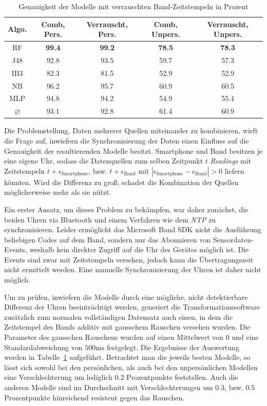 \begin{table}[h]
	\centering
	\begin{tabular}{|c|c|c||c|c|}
		\hline 
		\textbf{Algo.} & \textbf{Comb, Pers.} & \textbf{Verrauscht, Pers.} &\textbf{Comb, Unpers.} & \textbf{Verrauscht, Unpers.} \\ 
		\hline 
		\acs{RF} & \textbf{99.4} & \textbf{99.2} & \textbf{78.5} & \textbf{78.3} \\ 
		\acs{J48} & 92.8 & 93.5 & 59.7 & 57.3 \\ 
		\acs{IB}3 & 82.3 & 81.5 & 52.9 & 52.9 \\ 
		\acs{NB} & 96.2 & 95.7 & 60.9 & 60.5 \\ 
		\acs{MLP} & 94.8 & 94.2 & 54.9 & 55.4 \\ 
		\hline 
		$\varnothing$ & 93.1 & 92.8 & 61.4 & 60.9 \\ 
		\hline
	\end{tabular} 
	\caption{Genauigkeit der Modelle mit verrauschten Band-Zeitstempeln in Prozent}
	\label{tab:accuracy-noisy_timestamps}
\end{table}

Die Problemstellung, Daten mehrerer Quellen miteinander zu kombinieren, wirft die Frage auf, inwiefern die Synchronisierung der Daten einen Einfluss auf die Genauigkeit der resultierenden Modelle besitzt. Smartphone und Band besitzen je eine eigene Uhr, sodass die Datenquellen zum selben Zeitpunkt $t$ \textit{Readings} mit Zeitstempeln $t + \epsilon_\text{Smartphone}$, bzw. $t + \epsilon_\text{Band}$ mit $|\epsilon_\text{Smartphone} - \epsilon_\text{Band}| > 0$ liefern könnten. Wird die Differenz zu groß, schadet die Kombination der Quellen möglicherweise mehr als sie nützt.

Ein erster Ansatz, um dieses Problem zu bekämpfen, war daher zunächst, die beiden Uhren via Bluetooth und einem Verfahren wie dem \textit{\ac{NTP}} \cite{Mills} zu synchronisieren. Leider ermöglicht das Microsoft Band \acs{SDK} nicht die Ausführung beliebigen Codes auf dem Band, sondern nur das Abonnieren von Sensordaten-Events, weshalb kein direkter Zugriff auf die Uhr des Gerätes möglich ist. Die Events sind zwar mit Zeitstempeln versehen, jedoch kann die Übertragungszeit nicht ermittelt werden. Eine manuelle Synchronisierung der Uhren ist daher nicht möglich.

Um zu prüfen, inwiefern die Modelle durch eine mögliche, nicht detektierbare Differenz der Uhren beeinträchtigt werden, generiert die Transformationssoftware zusätzlich zum normalen vollständigen Datensatz auch einen, in dem die Zeitstempel des Bands additiv mit gausschem Rauschen versehen wurden. Die Parameter des gausschen Rauschens wurden auf einen Mittelwert von $0$ und eine Standardabweichung von $500 \text{ms}$ festgelegt. Die Ergebnisse der Auswertung werden in Tabelle~\ref{tab:accuracy-noisy_timestamps} aufgeführt. Betrachtet man die jeweils besten Modelle, so lässt sich sowohl bei den persönlichen, als auch bei den unpersönlichen Modellen eine Verschlechterung um lediglich $0.2$ Prozentpunkte feststellen. Auch die anderen Modelle sind im Durchschnitt mit Verschlechterungen um $0.3$, bzw. $0.5$ Prozentpunkte hinreichend resistent gegen das Rauschen.

